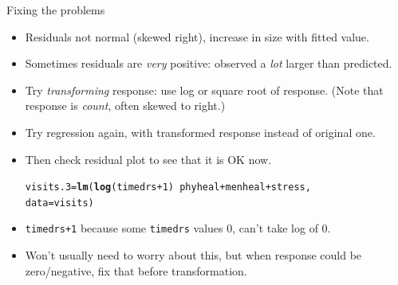 \documentclass[unknownkeysallowed]{beamer}\usepackage[]{graphicx}\usepackage[]{color}
\makeatletter
\newcommand{\hlnum}[1]{\textcolor[rgb]{0.686,0.059,0.569}{#1}}%
\newcommand{\hlopt}[1]{\textcolor[rgb]{0,0,0}{#1}}%
\newcommand{\hlstd}[1]{\textcolor[rgb]{0.345,0.345,0.345}{#1}}%
\newcommand{\hlkwb}[1]{\textcolor[rgb]{0.69,0.353,0.396}{#1}}%
\newcommand{\hlkwc}[1]{\textcolor[rgb]{0.333,0.667,0.333}{#1}}%
\newcommand{\hlkwd}[1]{\textcolor[rgb]{0.737,0.353,0.396}{\textbf{#1}}}%
\newenvironment{kframe}{%
 \def\at@end@of@kframe{}%
 \ifinner\ifhmode%
  \def\at@end@of@kframe{\end{minipage}}%
  \begin{minipage}{\columnwidth}%
 \fi\fi%
 \def\FrameCommand##1{\hskip\@totalleftmargin \hskip-\fboxsep
 \colorbox{shadecolor}{##1}\hskip-\fboxsep
     \hskip-\linewidth \hskip-\@totalleftmargin \hskip\columnwidth}%
 \MakeFramed {\advance\hsize-\width
   \@totalleftmargin\z@ \linewidth\hsize
   \@setminipage}}%
 {\par\unskip\endMakeFramed%
 \at@end@of@kframe}
\newenvironment{knitrout}{}{} %
\makeatother
\begin{document}
\begin{frame}[fragile]{Fixing the problems}

  \begin{itemize}
  \item Residuals not normal (skewed right), increase in size with
    fitted value.
  \item Sometimes residuals are {\em very} positive: observed a {\em lot} larger than predicted.
  \item Try {\em  transforming} response: use log or square root of response. (Note that response is {\em count}, often skewed to right.)
  \item Try regression again, with transformed response instead of
    original one.
  \item Then check residual plot to see that it is OK now.

 
\begin{knitrout}
\color{fgcolor}\begin{kframe}
\begin{alltt}
\hlstd{visits.3}\hlkwb{=}\hlkwd{lm}\hlstd{(}\hlkwd{log}\hlstd{(timedrs}\hlopt{+}\hlnum{1}\hlstd{)}\hlopt{~}\hlstd{phyheal}\hlopt{+}\hlstd{menheal}\hlopt{+}\hlstd{stress,}
            \hlkwc{data}\hlstd{=visits)}
\end{alltt}
\end{kframe}
\end{knitrout}
    
\item \texttt{timedrs+1}  because some \texttt{timedrs} values 0,
  can't take log of 0.
\item Won't usually need to worry about this, but when response could
  be zero/negative, fix that before transformation.
  \end{itemize}
  
\end{frame}
\end{document}
